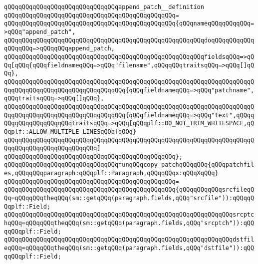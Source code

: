 \verb|qQQqqQQqqQQqqQQqqQQqqQQqqQQqqQQqappend_patch__definition|\newline
\verb|qQQqqQQqqQQqqQQqqQQqqQQqqQQqqQQqqQQqqQQqqQQqqQQq=|\newline
\verb|qQQqqQQqqQQqqQQqqQQqqQQqqQQqqQQqqQQqqQQqqQQqqQQq{qQQqnameqQQqqQQqqQQq=>qQQq"append_patch",|\newline
\verb|qQQqqQQqqQQqqQQqqQQqqQQqqQQqqQQqqQQqqQQqqQQqqQQqqQQqqQQqdoqQQqqQQqqQQqqQQqqQQq=>qQQqqQQqappend_patch,|\newline
\verb|qQQqqQQqqQQqqQQqqQQqqQQqqQQqqQQqqQQqqQQqqQQqqQQqqQQqqQQqfieldsqQQq=>qQQq[qQQq{qQQqfieldnameqQQq=>qQQq"filename",qQQqqQQqtraitsqQQq=>qQQq[]qQQq},|\newline
\verb|qQQqqQQqqQQqqQQqqQQqqQQqqQQqqQQqqQQqqQQqqQQqqQQqqQQqqQQqqQQqqQQqqQQqqQQqqQQqqQQqqQQqqQQqqQQqqQQqqQQqqQQq{qQQqfieldnameqQQq=>qQQq"patchname",qQQqtraitsqQQq=>qQQq[]qQQq},|\newline
\verb|qQQqqQQqqQQqqQQqqQQqqQQqqQQqqQQqqQQqqQQqqQQqqQQqqQQqqQQqqQQqqQQqqQQqqQQqqQQqqQQqqQQqqQQqqQQqqQQqqQQqqQQq{qQQqfieldnameqQQq=>qQQq"text",qQQqqQQqqQQqqQQqqQQqqQQqtraitsqQQq=>qQQq[qQQqplf::DO_NOT_TRIM_WHITESPACE,qQQqplf::ALLOW_MULTIPLE_LINESqQQq]qQQq}|\newline
\verb|qQQqqQQqqQQqqQQqqQQqqQQqqQQqqQQqqQQqqQQqqQQqqQQqqQQqqQQqqQQqqQQqqQQqqQQqqQQqqQQqqQQqqQQqqQQqqQQq]|\newline
\verb|qQQqqQQqqQQqqQQqqQQqqQQqqQQqqQQqqQQqqQQqqQQqqQQq};|\newline
\newline
\newline
\newline
\verb|qQQqqQQqqQQqqQQqqQQqqQQqqQQqqQQqfunqQQqcopy_patchqQQqqQQq{qQQqpatchfiles,qQQqqQQqparagraph:qQQqplf::Paragraph,qQQqqQQqx:qQQqXqQQq}|\newline
\verb|qQQqqQQqqQQqqQQqqQQqqQQqqQQqqQQqqQQqqQQqqQQqqQQq=|\newline
\verb|qQQqqQQqqQQqqQQqqQQqqQQqqQQqqQQqqQQqqQQqqQQqqQQq{qQQqqQQqqQQqsrcfileqQQq=qQQqqQQqtheqQQq(sm::getqQQq(paragraph.fields,qQQq"srcfile")):qQQqqQQqplf::Field;|\newline
\verb|qQQqqQQqqQQqqQQqqQQqqQQqqQQqqQQqqQQqqQQqqQQqqQQqqQQqqQQqqQQqqQQqsrcptchqQQq=qQQqqQQqtheqQQq(sm::getqQQq(paragraph.fields,qQQq"srcptch")):qQQqqQQqplf::Field;|\newline
\newline
\verb|qQQqqQQqqQQqqQQqqQQqqQQqqQQqqQQqqQQqqQQqqQQqqQQqqQQqqQQqqQQqqQQqdstfileqQQq=qQQqqQQqtheqQQq(sm::getqQQq(paragraph.fields,qQQq"dstfile")):qQQqqQQqplf::Field;|\newline
